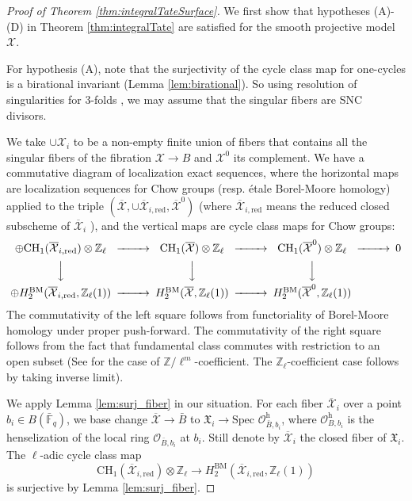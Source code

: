 \documentclass{amsart}
\theoremstyle{definition}
\theoremstyle{remark}
\newcommand{\mbb}{\mathbb}
\newcommand{\FF}{\mbb{F}}
\newcommand{\ZZ}{\mbb{Z}}
\newcommand{\mc}{\mathcal}
\newcommand{\mcX}{\mc{X}}
\newcommand{\OO}{\mc{O}}
\newcommand{\SP}{\text{Spec }}
\begin{document}
\begin{proof}[Proof of Theorem \ref{thm:integralTateSurface}]
We first show that hypotheses (A)-(D) in Theorem \ref{thm:integralTate} are satisfied for the smooth projective model $\mcX$.

For hypothesis (A), note that the surjectivity of the cycle class map for one-cycles is a birational invariant (Lemma \ref{lem:birational}). 
So using resolution of singularities for $3$-folds \cite{Resolution1, Resolution2, AbhyankarResolution}, we may assume that the singular fibers are SNC divisors.

We take $\cup \mcX_i$ to be a non-empty finite union of fibers that contains all the singular fibers of the fibration $\mcX \to B$ and $\mcX^0$ its complement.
We have a commutative diagram of localization exact sequences, where the horizontal maps are localization sequences for Chow groups \cite[Proposition 1.8]{Fulton98} (resp. \'etale Borel-Moore homology) applied to the triple $(\overline{\mcX}, \cup \overline{\mcX}_{i, \text{red}}, \overline{\mcX}^0)$ (where $\overline{\mcX}_{i, \text{red}}$ means the reduced closed subscheme of $\overline{\mcX}_{i}$ ), and the vertical maps are cycle class maps for Chow groups:
\begin{equation}\label{eq:loc}
    \begin{CD}
 \oplus \text{CH}_1(\overline{\mcX}_{i, \text{red}})\otimes \ZZ_\ell @>>> \text{CH}_1(\overline{\mcX})\otimes \ZZ_\ell @>>>\text{CH}_1 (\overline{\mcX}^0)\otimes \ZZ_\ell @>>> 0 \\
@VVV @VVV @VVV\\
\oplus H_{2}^{\text{BM}}(\overline{\mcX}_{i, \text{red}}, \ZZ_\ell(1)) @>>>H_2^{\text{BM}}(\overline{\mcX}, \ZZ_\ell(1))@>>>H_2^{\text{BM}}(\overline{\mcX}^0, \ZZ_\ell(1))\\
\end{CD}
\end{equation}
  The commutativity of the left square follows from functoriality of Borel-Moore homology under proper push-forward. The commutativity of the right square follows from the fact that fundamental class commutes with restriction to an open subset (See \cite[1.3.4, and Example 2.1]{BlochOgus} for the case of $\ZZ/\ell^m$-coefficient. The $\ZZ_\ell$-coefficient case follows by taking inverse limit).


We apply Lemma \ref{lem:surj_fiber} in our situation. 
For each fiber $\overline{\mcX}_i$ over a point $b_i \in B(\bar{\FF}_q)$, we base change $\overline{\mcX} \to \bar{B}$ to ${\mathfrak{X}}_i \to \SP \OO_{\bar{B}, b_i}^{\text{h}}$, where $\OO_{B, b_i}^{\text{h}}$ is the henselization of the local ring $\OO_{\bar{B}, b_i}$ at $b_i$. Still denote by $\overline{\mcX}_i$ the closed fiber of $\mathfrak{X}_i$.
The $\ell$-adic cycle class map
\[
\text{CH}_1(\overline{\mcX}_{i, \text{red}})\otimes \ZZ_\ell \to H_2^{\text{BM}}(\overline{\mcX}_{i, \text{red}}, \ZZ_\ell(1))
\]
is surjective by Lemma \ref{lem:surj_fiber}.


\end{proof}
\end{document}
